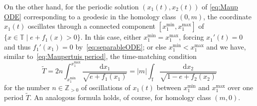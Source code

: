 \documentclass[11pt,letterpaper,oneside]{amsart}
\newcommand{\Z}{\mathbb{Z}}
\newcommand{\T}{\mathbb{T}}
\theoremstyle{definition}
\theoremstyle{remark}
\newcommand{\wt}{\widetilde}
\theoremstyle{definition}
\theoremstyle{remark}
\begin{document}
\medskip

On the other hand, for the periodic solution $(x_1(t), x_2(t))$ of \eqref{eq:Maup ODE} corresponding to a geodesic in the homology class $(0, m)$, the coordinate $x_1(t)$ oscillates through a connected component $[x_1^{\min}, x_1^{\max}]$ of $\{x \in \T \mid e + f_1(x) > 0\}$.
In this case, either $x_1^{\min} = x_1^{\max}$, forcing $x_1'(t) = 0$ and thus $f_1'(x_1)=0$ by~\eqref{eq:separableODE}; or else $x_1^{\min} < x_1^{\max}$ and we have, similar to~\eqref{eq:Maupertuis period}, the time-matching condition
\[
\wt T = 2n \int_{x_1^{\min}}^{x_1^{\max}} \frac{\mathrm{d}x_1}{\sqrt{e+f_1(x_1)}}=|m|
 \int_{\T} \frac{\mathrm{d}x_2}{\sqrt{1-e+f_2(x_2)}}
\]
for the number $n\in\Z_{>0}$ of oscillations of $x_1(t)$ between $x_1^{\min}$ and $ x_1^{\max}$ over one period $\wt T$.
An analogous formula holds, of course, for homology class $(m,0)$.

\medskip
\end{document}
